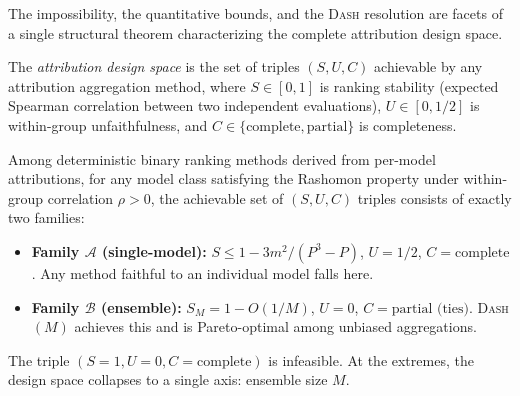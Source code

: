 \documentclass{jmlr}
\newcommand{\DASH}{\textsc{Dash}}
\begin{document}
The impossibility, the quantitative bounds, and the \DASH{} resolution are facets of a single structural theorem characterizing the complete attribution design space.

\begin{definition}
\label{def:design-space-def}
The \emph{attribution design space} is the set of triples $(S, U, C)$ achievable by any attribution aggregation method, where $S \in [0,1]$ is ranking stability (expected Spearman correlation between two independent evaluations), $U \in [0, 1/2]$ is within-group unfaithfulness, and $C \in \{\text{complete}, \text{partial}\}$ is completeness.
\end{definition}

\begin{theorem}
\label{thm:design-space-main}
Among deterministic binary ranking methods derived from per-model attributions, for any model class satisfying the Rashomon property under within-group correlation $\rho > 0$, the achievable set of $(S, U, C)$ triples consists of exactly two families:
\begin{itemize}
    \item \textbf{Family $\mathcal{A}$ (single-model):} $S \leq 1 - 3m^2/(P^3{-}P)$, $U = 1/2$, $C = \text{complete}$. Any method faithful to an individual model falls here.
    \item \textbf{Family $\mathcal{B}$ (ensemble):} $S_M = 1 - O(1/M)$, $U = 0$, $C = \text{partial (ties)}$. \DASH{}$(M)$ achieves this and is Pareto-optimal among unbiased aggregations.
\end{itemize}
The triple $(S{=}1, U{=}0, C{=}\text{complete})$ is infeasible. At the extremes, the design space collapses to a single axis: ensemble size $M$.
\end{theorem}
\end{document}
